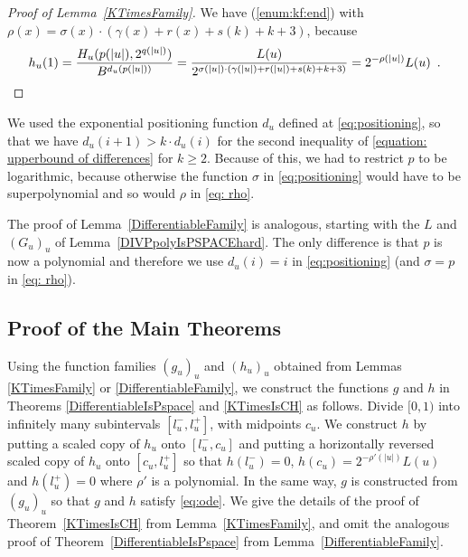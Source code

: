 \documentclass[12pt,a4paper]{article}
\theoremstyle{definition}
\theoremstyle{remark}
\begin{document}
\begin{proof}[Proof of Lemma~\ref{KTimesFamily}]
We have (\ref{enum:kf:end}) with
  $\rho(x) = \sigma(x) \cdot (\gamma(x)+r(x)+s(k)+k+3)$, because
  \begin{equation}
\label{eq: rho}
   h_u(1) 
   = \frac{H_u(p(|u|), 2^{q(|u|)})}{B^{d_u(p(|u|))}} 
   = \frac{L(u)}{2^{\sigma(|u|) \cdot (\gamma(|u|)+r(|u|)+s(k)+k+3)}} 
   = 2^{-\rho(|u|)} L(u)  \enspace . \qedhere
  \end{equation}
\end{proof}

We used the exponential positioning function $d _u$ 
defined at \eqref{eq:positioning}, 
so that we have $d _u (i + 1) > k \cdot d _u (i)$ for the 
second inequality of \eqref{equation: upperbound of differences}
for $k \geq 2$. 
Because of this, we had to restrict $p$ to be logarithmic, 
because otherwise the function $\sigma$ in \eqref{eq:positioning}
would have to be superpolynomial and so would $\rho$ in \eqref{eq: rho}. 

The proof of Lemma~\ref{DifferentiableFamily} is analogous, 
starting with the $L$ and $(G_u)_u$ of Lemma~\ref{DIVPpolyIsPSPACEhard}. 
The only difference is that $p$ is now a polynomial 
and therefore we use $d _u (i) = i$ in \eqref{eq:positioning}
(and $\sigma = p$ in \eqref{eq: rho}). 

\subsection{Proof of the Main Theorems}
\label{subsection: proof of theorems}
Using the function families $(g_u)_u$ and $(h_u)_u$ 
obtained from Lemmas \ref{KTimesFamily} or \ref{DifferentiableFamily}, 
we construct the functions $g$ and $h$ in 
Theorems \ref{DifferentiableIsPspace} and \ref{KTimesIsCH} as follows. 
Divide $[0,1)$ into infinitely many subintervals $[l^-_u, l^+_u]$,
with midpoints $c_u$.
We construct $h$ by putting a scaled copy of $h_u$ onto $[l^-_u, c_u]$ and
putting a horizontally reversed scaled copy of $h_u$ onto $[c_u, l^+_u]$ 
so that $h(l^-_u) = 0$, $h(c_u) = 2^{-\rho'(|u|)} L(u)$ and $h(l^+_u) = 0$ where $\rho'$ is a polynomial.
In the same way, $g$ is constructed from $(g_u)_u$ so that $g$ and $h$ satisfy \eqref{eq:ode}.
We give the details of the proof of 
Theorem~\ref{KTimesIsCH} from Lemma~\ref{KTimesFamily}, 
and omit the analogous proof of Theorem~\ref{DifferentiableIsPspace} 
from Lemma~\ref{DifferentiableFamily}. 
\end{document}
